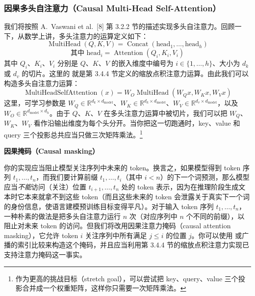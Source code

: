 \subsubsection{因果多头自注意力（Causal Multi-Head Self-Attention）}

我们将按照 A.~Vaswani et al.~[8] 第 3.2.2 节的描述实现多头自注意力。回顾一下，从数学上讲，多头注意力的运算定义如下：
\begin{equation}
\operatorname{MultiHead}(Q, K, V) = \operatorname{Concat}(\text{head}_1, \ldots, \text{head}_h)
\tag{12}
\end{equation}
\begin{equation}
\text{其中 } \text{head}_i = \operatorname{Attention}(Q_i, K_i, V_i)
\tag{13}
\end{equation}
其中 $Q_i$、$K_i$、$V_i$ 分别是 $Q$、$K$、$V$ 的嵌入维度中编号为 $i \in \{1, \ldots, h\}$、大小为 $d_k$ 或 $d_v$ 的切片。这里的  就是第 3.4.4 节定义的缩放点积注意力运算。由此我们可以构造多头自注意力运算：
\begin{equation}
\operatorname{MultiHeadSelfAttention}(x) = W_O \operatorname{MultiHead}(W_Q x, W_K x, W_V x)
\tag{14}
\end{equation}
这里，可学习参数是 $W_Q \in \mathbb{R}^{d_k \times d_{\mathrm{model}}}$、$W_K \in \mathbb{R}^{d_k \times d_{\mathrm{model}}}$、$W_V \in \mathbb{R}^{d_v \times d_{\mathrm{model}}}$，以及 $W_O \in \mathbb{R}^{d_{\mathrm{model}} \times d_h}$。由于 $Q$、$K$、$V$ 在多头注意力运算中被切片，我们可以把 $W_Q$、$W_K$、$W_V$ 看作沿输出维度为每个头分开。当你把这一切跑通时，key、value 和 query 三个投影总共应当只做三次矩阵乘法。\footnote{作为更高的挑战目标（stretch goal），可以尝试把 key、query、value 三个投影合并成一个权重矩阵，这样你只需要一次矩阵乘法。}

\textbf{因果掩码（Causal masking）}

你的实现应当阻止模型关注序列中未来的 token。换言之，如果模型得到 token 序列 $t_1, \ldots, t_n$，而我们要计算前缀 $t_1, \ldots, t_i$（其中 $i < n$）的下一个词预测，那么模型应当\textit{不能}访问（关注）位置 $t_{i+1}, \ldots, t_n$ 处的 token 表示，因为在推理阶段生成文本时它本来就拿不到这些 token（而且这些未来的 token 会泄露关于真实下一个词的身份信息，使语言建模预训练目标变得平凡）。对于输入 token 序列 $t_1, \ldots, t_n$，一种朴素的做法是把多头自注意力运行 $n$ 次（对应序列中 $n$ 个不同的前缀），以阻止对未来 token 的访问。但我们将改用因果注意力掩码（causal attention masking），它允许 token $i$ 关注序列中所有满足 $j \le i$ 的位置 $j$。你可以使用  或广播的索引比较来构造这个掩码，并且应当利用第 3.4.4 节的缩放点积注意力实现已支持注意力掩码这一事实。

